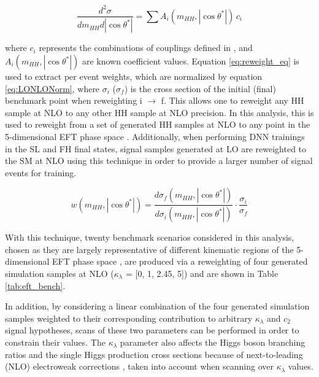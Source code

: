 \begin{equation} \label{eq:reweight_eq}
  \frac{d^2\sigma}{d m_{HH}d|\cos{\theta^*}| } = \sum A_i( m_{HH}, |\cos{\theta^*}| ) \, c_i
\end{equation}

where $c_i$ represents the combinations of couplings defined in \cite{Buchalla:2018yce}, and $A_i( m_{HH}, |\cos{\theta^*}| )$ are known coefficient values. Equation \ref{eq:reweight_eq} is used to extract per event weights, which are normalized by equation \ref{eq:LONLONorm}, where $\sigma_i$ ($\sigma_f$) is the cross section of the initial (final) benchmark point when reweighting i $\rightarrow$ f. This allows one to reweight any HH sample at NLO to any other HH sample at NLO precision. In this analysis, this is used to reweight from a set of generated HH samples at NLO to any point in the 5-dimensional EFT phase space \cite{Carvalho:2016rys,Buchalla:2018yce}. Additionally, when performing DNN trainings in the SL and FH final states, signal samples generated at LO are reweighted to the SM at NLO using this technique in order to provide a larger number of signal events for training.

\begin{equation} \label{eq:LONLONorm}
  w(m_{HH}, |\cos{\theta^*}|) = \frac{d\sigma_f(m_{HH}, |\cos{\theta^*}|)}{d\sigma_i(m_{HH}, |\cos{\theta^*}|)} \cdot \frac{\sigma_i}{\sigma_f}
\end{equation}

With this technique, twenty benchmark scenarios considered in this analysis, chosen as they are largely representative of different kinematic regions of the 5-dimensional EFT phase space \cite{Carvalho:2015ttv,Buchalla:2018yce,Capozi:2019xsi}, are produced via a reweighting of four generated simulation samples at NLO ($\kappa_{\lambda}$ = [0, 1, 2.45, 5]) and are shown in Table \ref{tab:eft_bench}.  

In addition, by considering a linear combination of the four generated simulation samples weighted to their corresponding contribution to arbitrary $\kappa_{\lambda}$ and $c_{2}$ signal hypotheses, scans of these two parameters can be performed in order to constrain their values. The $\kappa_{\lambda}$ parameter also affects the Higgs boson branching ratios and the single Higgs production cross sections because of next-to-leading (NLO) electroweak corrections \cite{Degrassi:2016wml,Maltoni:2017ims}, taken into account when scanning over $\kappa_{\lambda}$ values.

